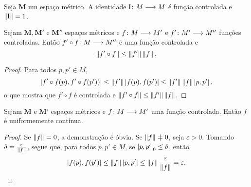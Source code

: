 %		

\begin{exercise}
Seja $\bm M$ um espaço métrico. A identidade ${\mathrm{I}}\colon {M} \longrightarrow {M}$ é função controlada e $\left\Vert{\mathrm{I}}\right\Vert=1$.
\end{exercise}

\begin{proposition}
\label{prop:composicao.controlada}
Sejam $\bm M, \bm M'$ e $\bm M''$ espaços métricos e ${f}\colon {M} \longrightarrow {M'}$ e ${f'}\colon {M'} \longrightarrow {M''}$ funções controladas. Então ${f' \circ f}\colon {M} \longrightarrow {M''}$ é uma função controlada e
	\begin{equation*}
		\left\Vert{f' \circ f}\right\Vert \leq \left\Vert{f'}\right\Vert\left\Vert{f}\right\Vert.
	\end{equation*}
\end{proposition}
\begin{proof}
Para todos $p,p' \in M$,
	\begin{equation*}
	\left\vert{f' \circ f(p)},{f' \circ f(p'))}\right\vert \leq \left\Vert{f'}\right\Vert \left\vert{f(p)},{f(p')}\right\vert \leq \left\Vert{f'}\right\Vert\left\Vert{f}\right\Vert\left\vert{p},{p'}\right\vert,
	\end{equation*}
o que mostra que $f' \circ f$ é controlada e $\left\Vert{f' \circ f}\right\Vert \leq \left\Vert{f'}\right\Vert\left\Vert{f}\right\Vert$.
\end{proof}

\begin{proposition}
\label{prop:continuidade.controlada}
Sejam $\bm M$ e $\bm M'$ espaços métricos e ${f}\colon {M} \longrightarrow {M'}$ uma função controlada. Então $f$ é uniformemente contínua.
\end{proposition}
\begin{proof}
Se $\left\Vert{f}\right\Vert=0$, a demonstração é óbvia. Se $\distor{f} \neq 0$, seja $\varepsilon>0$. Tomando $\delta=\frac{\varepsilon}{\left\Vert{f}\right\Vert}$, segue que, para todos $p,p' \in M$, se $\left\vert{p},{p'}\right\vert_0 \leq \delta$, então
	\begin{equation*}
	\left\vert{f(p)},{f(p')}\right\vert \leq \left\Vert{f}\right\Vert\left\vert{p},{p'}\right\vert \leq \left\Vert{f}\right\Vert\frac{\varepsilon}{\left\Vert{f}\right\Vert} = \varepsilon.
	\qedhere
	\end{equation*}
\end{proof}

